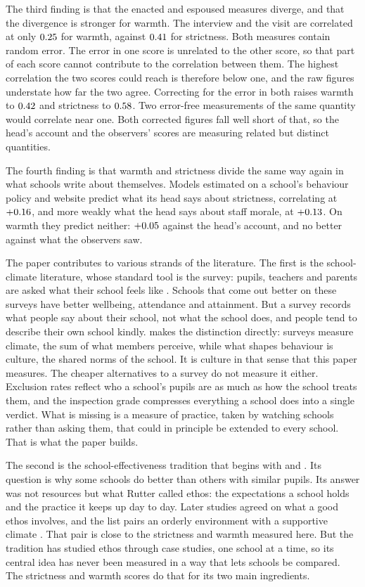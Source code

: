 The third finding is that the enacted and espoused measures diverge,
and that the divergence is stronger for warmth. The interview and the
visit are correlated at only $0.25$ for warmth, against $0.41$ for strictness. Both measures contain random error. The error in one score is unrelated to the other score, so that part of each score cannot contribute to the correlation between them. The highest correlation the two scores could reach is therefore below one, and the raw figures understate how far the two agree. Correcting for the error in both raises warmth to $0.42$ and strictness to $0.58$. Two error-free measurements of the same quantity would correlate near one. Both corrected figures fall well short of that, so the head's account and the observers' scores are measuring related but distinct quantities.

The fourth finding is that warmth and strictness divide the same way again in what schools write about themselves. Models estimated on a school's behaviour policy and website predict what its head says about strictness, correlating at $+0.16$, and more weakly what the head says about staff morale, at $+0.13$. On warmth they predict neither: $+0.05$ against the head's account, and no better against what the observers saw.

The paper contributes to various strands of the literature. The first is the school-climate literature, whose standard tool is the survey: pupils, teachers and parents are asked what their school feels like \citep{hoy2001,cohen2009,thapa2013}. Schools that come out better on these surveys have better wellbeing, attendance and attainment. But a survey records what people say about their school, not what the school does, and people tend to describe their own school kindly. \citet{vanhoutte2005} makes the distinction directly: surveys measure climate, the sum of what members perceive, while what shapes behaviour is culture, the shared norms of the school. It is culture in that sense that this paper measures. The cheaper alternatives to a survey do not measure it either. Exclusion rates \citep{machin2020} reflect who a school's pupils are as much as how the school treats them, and the inspection grade compresses everything a school does into a single verdict. What is missing is a measure of practice, taken by watching schools rather than asking them, that could in principle be extended to every school. That is what the paper builds.

The second is the school-effectiveness tradition that begins with \citet{coleman1966} and \citet{rutter1979}. Its question is why some schools do better than others with similar pupils. Its answer was not resources but what Rutter called ethos: the expectations a school holds and the practice it keeps up day to day. Later studies agreed on what a good ethos involves, and the list pairs an orderly environment with a supportive climate \citep{edmonds1979,sammons1995,teddlie2000}. That pair is close to the strictness and warmth measured here. But the tradition has studied ethos through case studies, one school at a time, so its central idea has never been measured in a way that lets schools be compared. The strictness and warmth scores do that for its two main ingredients.

